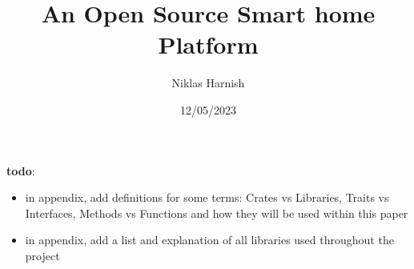 \documentclass{LULCSProject}
\title{An Open Source Smart home Platform}
\author{Niklas Harnish}
\date{12/05/2023}
\begin{document}
\maketitle


\newpage
\listoffigures
\newpage
\listoftables

\newpage
\textbf{todo}:
\begin{itemize}
    \item in appendix, add definitions for some terms: Crates vs Libraries, Traits vs Interfaces, Methods vs Functions and how they will be used within this paper
    \item in appendix, add a list and explanation of all libraries used throughout the project
\end{itemize}

\pagebreak
{}



\newpage


\newpage


\newpage


\newpage


\newpage


\newpage


\newpage
\appendix

\newpage

\end{document}
